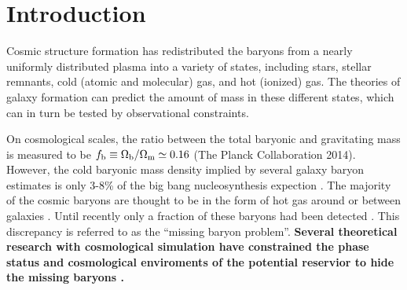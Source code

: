 \documentclass[useAMS,usenatbib]{mn2e}
\begin{document}
\setcounter{footnote}{1}


\section{Introduction}
\label{sec:intro}
Cosmic structure formation has redistributed the baryons from  a
nearly uniformly distributed plasma into a variety of states,
including stars, stellar remnants, cold (atomic and molecular) gas,
and hot (ionized) gas. The theories of galaxy formation can predict
the amount of mass in these different states, which can in turn be tested by
observational constraints.  

On cosmological scales, the ratio between the total baryonic and
gravitating mass is measured to be $f_{\rm b}\equiv \Omega_{\rm
  b}/\Omega_{\rm m}\simeq 0.16$ (The Planck Collaboration 2014).
However, the cold baryonic mass density implied by several galaxy baryon
estimates is only 3-8\% of the big bang nucleosynthesis expection
\citep{Persic92, Fukugita98,  Bell03, McGaugh10}.  The majority of the
cosmic baryons are thought to be in the form of hot gas around or
between galaxies \citep{Cen09}. Until recently only a fraction of
these baryons had been detected \citep{Bregman07, Shull12}.  This
discrepancy is referred to as the ``missing baryon problem''.
{\bf Several theoretical research with cosmological simulation
have constrained the phase status and cosmological enviroments of
the potential reservior to hide the missing baryons 
\citep{Yoshida05, He05, Dave10, Zhu11, Haider16}.}
\end{document}
